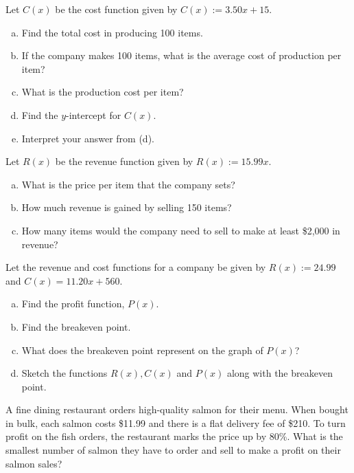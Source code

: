 \documentclass[11pt,letterpaper]{article}
\begin{document}

 Let $C(x)$ be the cost function given by $C(x):= 3.50x + 15$.
        \begin{enumerate}[(a)]
        \item Find the total cost in producing 100 items. \vfill
        \item If the company makes 100 items, what is the average cost of production per item? \vfill
        \item What is the production cost per item? \vfill
        \item Find the $y$-intercept for $C(x)$. \vfill
        \item Interpret your answer from (d). \vfill
        \end{enumerate}



\newpage



 Let $R(x)$ be the revenue function given by $R(x):= 15.99x$. 
	\begin{enumerate}[(a)]
	\item What is the price per item that the company sets? \vfill
	\item How much revenue is gained by selling 150 items? \vfill
	\item How many items would the company need to sell to make at least \$2,000 in revenue? \vfill 
	\end{enumerate}



\newpage



 Let the revenue and cost functions for a company be given by $R(x):= 24.99$ and $C(x)= 11.20x + 560$. 
\begin{enumerate}[(a)]
\item Find the profit function, $P(x)$. \vfill
\item Find the breakeven point. \vfill
\item What does the breakeven point represent on the graph of $P(x)$? \vfill
\item Sketch the functions $R(x), C(x)$ and $P(x)$ along with the breakeven point. \vfill
\end{enumerate}



\newpage



 A fine dining restaurant orders high-quality salmon for their menu. When bought in bulk, each salmon costs \$11.99 and there is a flat delivery fee of \$210. To turn profit on the fish orders, the restaurant marks the price up by 80\%. What is the smallest number of salmon they have to order and sell to make a profit on their salmon sales? 
\end{document}

